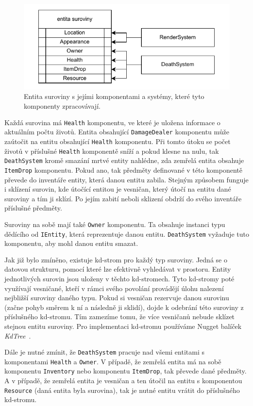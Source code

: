 \begin{figure}[!htb]
  \centering
  \includegraphics[width=0.8\linewidth]{img/resource.pdf}
  \caption{Entita suroviny s jejími komponentami a systémy, které tyto komponenty zpracovávají.}
  \label{fig:resource}
\end{figure}

Každá surovina má \texttt{Health} komponentu, ve které je uložena informace o aktuálním počtu životů. Entita obsahující \texttt{DamageDealer} komponentu může zaútočit na entitu obsahující \texttt{Health} komponentu. Při tomto útoku se počet životů v příslušné \texttt{Health} komponentě sníží a pokud klesne na nulu, tak \texttt{DeathSystem} kromě smazání mrtvé entity nahlédne, zda zemřelá entita obsahuje \texttt{ItemDrop} komponentu. Pokud ano, tak předměty definované v této komponentě převede do inventáře entity, která danou entitu zabila. Stejným způsobem funguje i sklízení surovin, kde útočící entitou je vesničan, který útočí na entitu dané suroviny a tím ji sklízí. Po jejím zabití neboli sklizení obdrží do svého inventáře příslušné předměty.

Suroviny na sobě mají také \texttt{Owner} komponentu. Ta obsahuje instanci typu dědícího od \texttt{IEntity}, která reprezentuje danou entitu. \texttt{DeathSystem} vyžaduje tuto komponentu, aby mohl danou entitu smazat.

Jak již bylo zmíněno, existuje kd-strom pro každý typ suroviny. Jedná se o datovou strukturu, pomocí které lze efektivně vyhledávat v prostoru. Entity jednotlivých surovin jsou uloženy v těchto kd-stromech. Tyto kd-stromy poté využívají vesničané, kteří v rámci svého povolání provádějí úlohu nalezení nejbližší suroviny daného typu. Pokud si vesničan rezervuje danou surovinu (začne pohyb směrem k ní a následně ji sklidí), dojde k odebrání této suroviny z příslušného kd-stromu. Tím zamezíme tomu, že více vesničanů nebude sklízet stejnou entitu suroviny. Pro implementaci kd-stromu používáme Nugget balíček \textit{KdTree}~\cite{KdTree}.

Dále je nutné zmínit, že \texttt{DeathSystem} pracuje nad všemi entitami s komponentami \texttt{Health} a \texttt{Owner}. V případě, že zemřelá entita má na sobě komponentu \texttt{Inventory} nebo komponentu \texttt{ItemDrop}, tak převede dané předměty. A v případě, že zemřelá entita je vesničan a ten útočil na entitu s komponentou \texttt{Resource} (daná entita byla surovina), tak je nutné entitu vrátit do příslušného kd-stromu.

